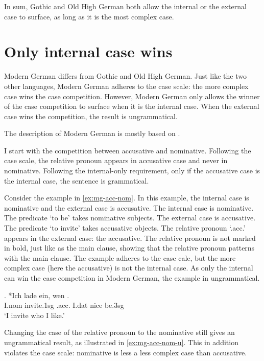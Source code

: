 In sum, Gothic and Old High German both allow the internal or the external case to surface, as long as it is the most complex case.

\section{Only internal case wins}

Modern German differs from Gothic and Old High German. Just like the two other languages, Modern German adheres to the case scale: the more complex case wins the case competition. However, Modern German only allows the winner of the case competition to surface when it is the internal case. When the external case wins the competition, the result is ungrammatical.

The description of Modern German is mostly based on \citep{vogel2001}.

I start with the competition between accusative and nominative. Following the case scale, the relative pronoun appears in accusative case and never in nominative. Following the internal-only requirement, only if the accusative case is the internal case, the sentence is grammatical.

Consider the example in \ref{ex:mg-acc-nom}. In this example, the internal case is nominative and the external case is accusative.
The internal case is nominative. The predicate  `to be' takes nominative subjects.
The external case is accusative. The predicate  `to invite' takes accusative objects.
The relative pronoun  `.\ac{acc}.' appears in the external case: the accusative. The relative pronoun is not marked in bold, just like as the main clause, showing that the relative pronoun patterns with the main clause.
The example adheres to the case cale, but the more complex case (here the accusative) is not the internal case. As only the internal can win the case competition in Modern German, the example in ungrammatical.

\exg. *Ich {lade ein}, wen   .\\
I.\ac{nom} invite.1\ac{sg}\scsub{[acc]} .\ac{acc}. I.\ac{dat} nice be.3\ac{sg}\scsub{[nom]}\\
`I invite who I like.' \label{ex:mg-acc-nom}

Changing the case of the relative pronoun to the nominative still gives an ungrammatical result, as illustrated in \ref{ex:mg-acc-nom-u}. This in addition violates the case scale: nominative is less a less complex case than accusative.

